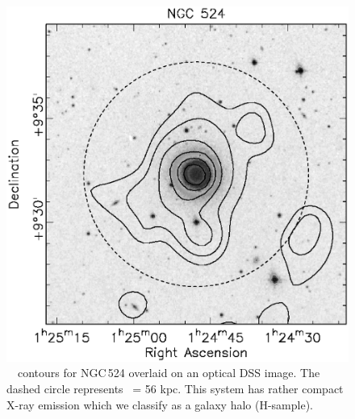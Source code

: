 \documentclass[usenatbib]{mn2e}
\begin{document}
\begin{figure}
  \begin{minipage}[t]{241pt}
    \centering

    \includegraphics[width=0.9\linewidth]{fig_03.ps}
    \caption{\ROSAT\ \PSPC\ contours for NGC\,524 overlaid on an optical DSS
             image.  The dashed circle represents \rcut\ = 56 kpc.  This system
             has rather compact X-ray emission which we classify as a galaxy halo
             (H-sample).}
    \label{fig_ngc524_ovly}
  
  \end{minipage}\hspace{18pt}
  \begin{minipage}[t]{241pt}
  \centering


\end{minipage}
\end{figure}
\end{document}
